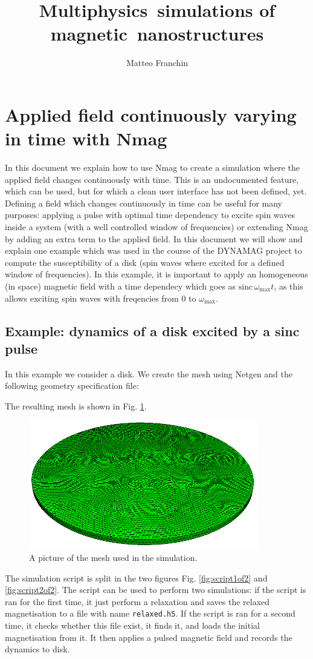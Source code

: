 \documentclass[11pt,oneside,openany]{article}
\author{Matteo Franchin}
\title{Multiphysics~simulations of magnetic~nanostructures}
\begin{document}
\titlepage

\section{Applied field continuously varying in time with Nmag}
In this document we explain how to use Nmag to create a simulation where
the applied field changes continuously with time.
This is an undocumented feature, which can be used, but for which a clean
user interface has not been defined, yet.
Defining a field which changes continuously in time can be useful for many
purposes: applying a pulse with optimal time dependency to excite spin waves
inside a system (with a well controlled window of frequencies) or extending
Nmag by adding an extra term to the applied field.
In this document we will show and explain one example which was used
in the course of the DYNAMAG project to compute the susceptibility
of a disk (spin waves where excited for a defined window of frequencies).
In this example, it is important to apply an homogeneous (in space) magnetic
field with a time dependecy which goes as
$\mathrm{sinc} \, \omega_{\mathrm{max}} t$,
as this allows exciting spin waves with freqencies from 0 to
$\omega_{\mathrm{max}}$.


\subsection{Example: dynamics of a disk excited by a sinc pulse}
In this example we consider a disk. We create the mesh using Netgen and
the following geometry specification file:
%

%
The resulting mesh is shown in Fig. \ref{fig:mesh}.
%
\begin{figure}[h]
\begin{center}
\includegraphics[width=10.0cm]{disk}
\caption[Sketch]{A picture of the mesh used in the simulation.}
\label{fig:mesh}
\end{center}
\end{figure}
%
The simulation script is split in the two figures Fig. \ref{fig:script1of2} and
\ref{fig:script2of2}.  The script can be used to perform two simulations: if
the script is ran for the first time, it just perform a relaxation and saves
the relaxed magnetisation to a file with name \verb|relaxed.h5|. If the script
is ran for a second time, it checks whether this file exist, it finds it, and
loads the initial magnetisation from it. It then applies a pulsed magnetic
field and records the dynamics to disk.
\end{document}
